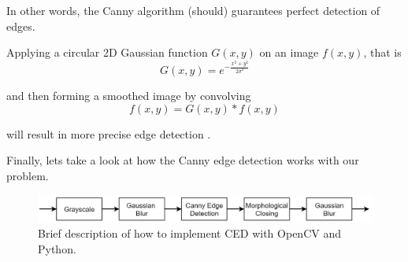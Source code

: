 In other words, the Canny algorithm (should) guarantees perfect detection of edges.

Applying a circular 2D Gaussian function $G(x,y)$ on an image $f(x,y)$, that is 
\begin{equation}
	G(x,y) = e^{-\frac{x^2+y^2}{2\sigma^2}}
\end{equation}

and then forming a smoothed image by convolving  
\begin{equation}
	f(x,y) = G(x,y) * f(x,y)
\end{equation}

will result in more precise edge detection \cite{gonzalez2018digitalChapter10.2}. 	



Finally, lets take a look at how the Canny edge detection works with our problem. 
\begin{figure}[h!]
	\centering
	\includegraphics[width=1\textwidth]{figures/ImageAnalysis/Canny/Canny_BlockD.jpg}
	\caption{Brief description of how to implement CED with OpenCV and Python.}
	\label{fig:Canny_BlockD}
\end{figure}


